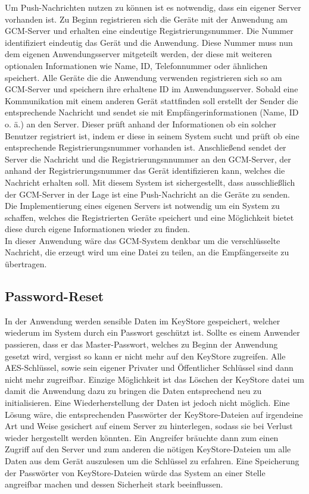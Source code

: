 \documentclass[10pt, a4paper]{scrreprt}
\begin{document}
Um Push-Nachrichten nutzen zu können ist es notwendig, dass ein eigener Server vorhanden ist. Zu Beginn registrieren sich die Geräte mit der Anwendung am GCM-Server und erhalten eine eindeutige Registrierungsnummer. Die Nummer identifiziert eindeutig das Gerät und die Anwendung. Diese Nummer muss nun dem eigenen Anwendungsserver mitgeteilt werden, der diese mit weiteren optionalen Informationen wie Name, ID, Telefonnummer oder ähnlichen speichert. Alle Geräte die die Anwendung verwenden registrieren sich so am GCM-Server und speichern ihre erhaltene ID im Anwendungsserver. Sobald eine Kommunikation mit einem anderen Gerät stattfinden soll erstellt der Sender die entsprechende Nachricht und sendet sie mit Empfängerinformationen (Name, ID o. ä.) an den Server. Dieser prüft anhand der Informationen ob ein solcher Benutzer registriert ist, indem er diese in seinem System sucht und prüft ob eine entsprechende Registrierungsnummer vorhanden ist. Anschließend sendet der Server die Nachricht und die Registrierungsnnummer an den GCM-Server, der anhand der Registrierungsnummer das Gerät identifizieren kann, welches die Nachricht erhalten soll. Mit diesem System ist sichergestellt, dass ausschließlich der GCM-Server in der Lage ist eine Push-Nachricht an die Geräte zu senden. Die Implementierung eines eigenen Servers ist notwendig um ein System zu schaffen, welches die Registrierten Geräte speichert und eine Möglichkeit bietet diese durch eigene Informationen wieder zu finden. \\
In dieser Anwendung wäre das GCM-System denkbar um die verschlüsselte Nachricht, die erzeugt wird um eine Datei zu teilen, an die Empfängerseite zu übertragen.


\subsection{Password-Reset}
In der Anwendung werden sensible Daten im KeyStore gespeichert, welcher wiederum im System durch ein Passwort geschützt ist. Sollte es einem Anwender passieren, dass er das Master-Passwort, welches zu Beginn der Anwendung gesetzt wird, vergisst so kann er nicht mehr auf den KeyStore zugreifen. Alle AES-Schlüssel, sowie sein eigener Privater und Öffentlicher Schlüssel sind dann nicht mehr zugreifbar. Einzige Möglichkeit ist das Löschen der KeyStore datei um damit die Anwendung dazu zu bringen die Daten entsprechend neu zu initialisieren. Eine Wiederherstellung der Daten ist jedoch nicht möglich. Eine Lösung wäre, die entsprechenden Passwörter der KeyStore-Dateien auf irgendeine Art und Weise gesichert auf einem Server zu hinterlegen, sodass sie bei Verlust wieder hergestellt werden könnten. Ein Angreifer bräuchte dann zum einen Zugriff auf den Server und zum anderen die nötigen KeyStore-Dateien um alle Daten aus dem Gerät auszulesen um die Schlüssel zu erfahren. Eine Speicherung der Passwörter von KeyStore-Dateien würde das System an einer Stelle angreifbar machen und dessen Sicherheit stark beeinflussen.
\end{document}

